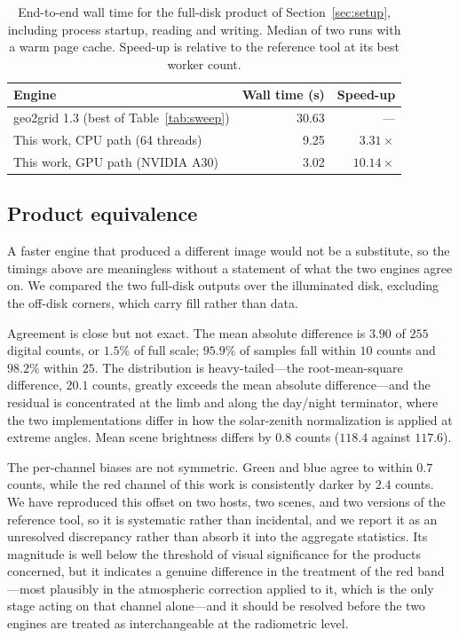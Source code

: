 \documentclass[11pt]{article}
\begin{document}
\begin{table}[t]
\caption{End-to-end wall time for the full-disk product of
Section~\ref{sec:setup}, including process startup, reading and writing.
Median of two runs with a warm page cache. Speed-up is relative to the
reference tool at its best worker count.}\label{tab:walltime}
\centering
\begin{tabular}{lrr}
\toprule
Engine & Wall time (s) & Speed-up \\
\midrule
geo2grid 1.3 (best of Table~\ref{tab:sweep}) & 30.63 & --- \\
This work, CPU path (64 threads) & 9.25 & $3.31\times$ \\
This work, GPU path (NVIDIA A30) & 3.02 & $10.14\times$ \\
\bottomrule
\end{tabular}
\end{table}

\subsection{Product equivalence}
\label{sec:equivalence}

A faster engine that produced a different image would not be a substitute, so
the timings above are meaningless without a statement of what the two engines
agree on. We compared the two full-disk outputs over the illuminated disk,
excluding the off-disk corners, which carry fill rather than data.

Agreement is close but not exact. The mean absolute difference is $3.90$ of
$255$ digital counts, or $1.5\%$ of full scale; $95.9\%$ of samples fall within
$10$ counts and $98.2\%$ within $25$. The distribution is heavy-tailed---the
root-mean-square difference, $20.1$ counts, greatly exceeds the mean absolute
difference---and the residual is concentrated at the limb and along the
day/night terminator, where the two implementations differ in how the
solar-zenith normalization is applied at extreme angles. Mean scene brightness
differs by $0.8$ counts ($118.4$ against $117.6$).

The per-channel biases are not symmetric. Green and blue agree to within $0.7$
counts, while the red channel of this work is consistently darker by $2.4$
counts. We have reproduced this offset on two hosts, two scenes, and two
versions of the reference tool, so it is systematic rather than incidental, and
we report it as an unresolved discrepancy rather than absorb it into the
aggregate statistics. Its magnitude is well below the threshold of visual
significance for the products concerned, but it indicates a genuine difference
in the treatment of the red band---most plausibly in the atmospheric correction
applied to it, which is the only stage acting on that channel alone---and it
should be resolved before the two engines are treated as interchangeable at the
radiometric level.
\end{document}
